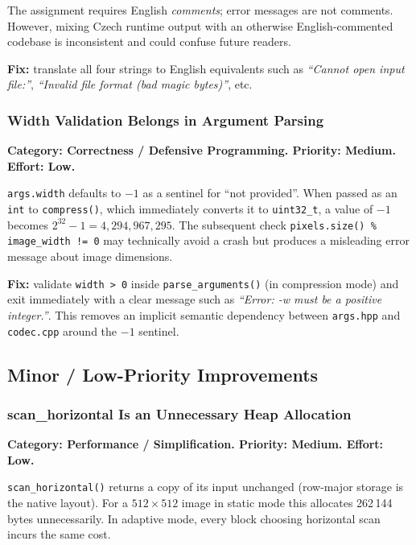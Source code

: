 The assignment requires English \emph{comments}; error messages are not comments.
However, mixing Czech runtime output with an otherwise English-commented codebase
is inconsistent and could confuse future readers.

\textbf{Fix:} translate all four strings to English equivalents such as
\textit{``Cannot open input file:''}, \textit{``Invalid file format (bad magic bytes)''}, etc.

\subsubsection{Width Validation Belongs in Argument Parsing}

\textbf{Category: Correctness / Defensive Programming. Priority: Medium. Effort: Low.}

\texttt{args.width} defaults to $-1$ as a sentinel for ``not provided''.
When passed as an \texttt{int} to \texttt{compress()}, which immediately converts it
to \texttt{uint32\_t}, a value of $-1$ becomes $2^{32}-1 = 4{,}294{,}967{,}295$.
The subsequent check \texttt{pixels.size() \% image\_width != 0} may technically
avoid a crash but produces a misleading error message about image dimensions.

\textbf{Fix:} validate \texttt{width > 0} inside \texttt{parse\_arguments()} (in compression mode)
and exit immediately with a clear message such as \textit{``Error: -w must be a positive integer.''}.
This removes an implicit semantic dependency between \texttt{args.hpp} and \texttt{codec.cpp}
around the $-1$ sentinel.

\subsection{Minor / Low-Priority Improvements}

\subsubsection{scan\_horizontal Is an Unnecessary Heap Allocation}

\textbf{Category: Performance / Simplification. Priority: Medium. Effort: Low.}

\texttt{scan\_horizontal()} returns a copy of its input unchanged (row-major storage is
the native layout).
For a $512 \times 512$ image in static mode this allocates 262\,144 bytes unnecessarily.
In adaptive mode, every block choosing horizontal scan incurs the same cost.

